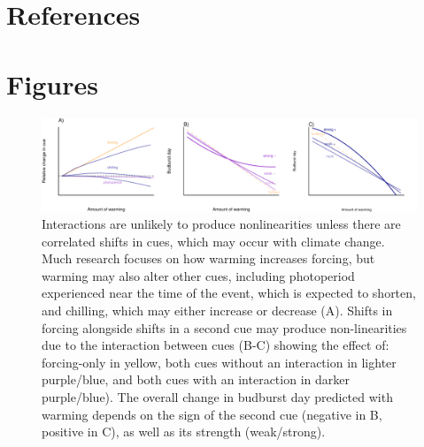 \documentclass[11pt,letter]{article}
\begin{document}
\clearpage

\section{References}


\clearpage
\section{Figures}
\clearpage
\begin{figure}
\centering
\includegraphics[width=1\textwidth]{..//..//analyses/limitingcues/figures/intxnsims2021photoaltwithchill_3panels.pdf} %
\caption{Interactions are unlikely to produce nonlinearities unless there are correlated shifts in cues, which may occur with climate change. Much research focuses on how warming increases forcing, but warming may also alter other cues, including photoperiod experienced near the time of the event, which is expected to shorten, and chilling, which may either increase or decrease (A). Shifts in forcing alongside shifts in a second cue may produce non-linearities due to the interaction between cues (B-C) showing the effect of: forcing-only in yellow, both cues without an interaction in lighter purple/blue, and both cues with an interaction in darker purple/blue). The overall change in budburst day predicted with warming depends on the sign of the second cue (negative in B, positive in C), as well as its strength (weak/strong).}
  \label{fig:intxncues}
\end{figure}
\end{document}
